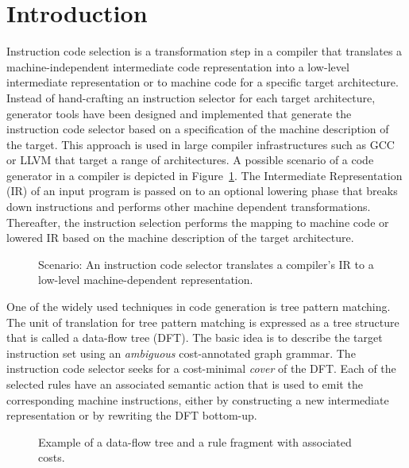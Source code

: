 \section{Introduction}

%
Instruction code selection is a transformation step in a compiler that
translates a machine-independent intermediate code representation into
a low-level intermediate representation or to machine code for a
specific target architecture. Instead of hand-crafting an instruction
selector for each target architecture, generator tools have been
designed and implemented that generate the instruction code selector based
on a specification of the machine description of the
target. This approach is used in large compiler infrastructures such
as GCC or LLVM that target a range of architectures.  A possible
scenario of a code generator in a compiler is depicted in
Figure~\ref{fig:instruction-selection}. The Intermediate
Representation (IR) of an input program is passed on to an optional
lowering phase that breaks down instructions and performs other
machine dependent transformations. Thereafter, the instruction
selection performs the mapping to machine code or lowered IR based on
the machine description of the target architecture.


\begin{figure}[t]
  \begin{center}
  \end{center}
  \caption{Scenario: An instruction code selector translates a compiler's IR to a
    low-level machine-dependent representation.}
  \label{fig:instruction-selection}
\end{figure}

One of the widely used techniques in code generation is tree pattern
matching. The unit of translation for tree pattern matching is 
expressed as a tree structure
that is called a data-flow tree (DFT). 
The basic idea is
to describe the target instruction set using an \emph{ambiguous}
cost-annotated graph grammar. The instruction code selector seeks for a
cost-minimal \emph{cover} of the DFT. Each of the selected rules have
an associated semantic action that is used to emit the corresponding
machine instructions, either by constructing a new intermediate
representation or by rewriting the DFT bottom-up.
\begin{figure}[ht]
  \begin{center}
  \end{center}
  \caption{Example of a data-flow tree and a rule fragment with associated costs.}
  \label{fig:tpm}
\end{figure}


